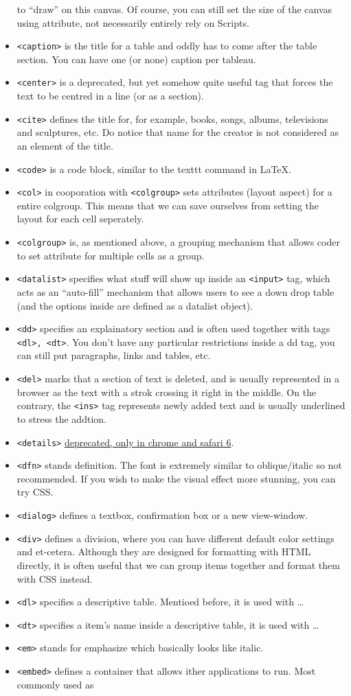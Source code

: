 \documentclass[oneside, 12pt]{article}
\newcommand{\itemm}[1]{\item \texttt{#1}}
\begin{document}
\begin{itemize}
	to ``draw'' on this canvas. Of course, you can still set the size of the canvas using attribute, 
	not necessarily entirely rely on Scripts.
	\itemm{<caption>} is the title for a table and oddly has to come after the table section. You can have
	one (or none) caption per tableau. 
	\itemm{<center>} is a deprecated, but yet somehow quite useful tag that forces the text to be
	centred in a line (or as a section). 
	\itemm{<cite>} defines the title for, for example, books, songs, albums, televisions and sculptures, etc.
	Do notice that name for the creator is not considered as an element of the title.
	\itemm{<code>} is a code block, similar to the texttt command in \LaTeX.
	\itemm{<col>} in cooporation with \texttt{<colgroup>} sets attributes (layout aspect) for a entire
	colgroup. This means that we can save ourselves from setting the layout for each cell seperately. 
	\itemm{<colgroup>} is, as mentioned above, a grouping mechanism that allows coder to set attribute
	for multiple cells as a group.
	\itemm{<datalist>} specifies what stuff will show up inside an \texttt{<input>} tag, which acts as
	an ``auto-fill'' mechanism that allows users to see a down drop table (and the options inside are
	defined as a datalist object).
	\itemm{<dd>} specifies an explainatory section and is often used together with tags \texttt{<dl>, <dt>}.
	You don't have any particular restrictions inside a dd tag, you can still put paragraphs, links and tables, etc.
	\itemm{<del>} marks that a section of text is deleted, and is usually represented in a browser as 
	the text with a strok crossing it right in the middle. On the contrary, the \texttt{<ins>} tag 
	represents newly added text and is usually underlined to stress the addtion.
	\itemm{<details>} \underline{deprecated, only in chrome and safari 6}.
	\itemm{<dfn>} stands definition. The font is extremely similar to oblique/italic so not recommended.
	If you wish to make the visual effect more stunning, you can try CSS.
	\itemm{<dialog>} defines a textbox, confirmation box or a new view-window. 
	\itemm{<div>} defines a division, where you can have different default color settings and et-cetera. 
	Although they are designed for formatting with HTML directly, it is often useful that we can group
	items together and format them with CSS instead.
	\itemm{<dl>} specifies a descriptive table. Mentioed before, it is used with \ldots
	\itemm{<dt>} specifies a item's name  inside a descriptive table, it is used with \ldots
	\itemm{<em>} stands for emphasize which basically looks like italic.
	\itemm{<embed>} defines a container that allows ither applications to run. Most commonly used as

\end{itemize}
\end{document}
